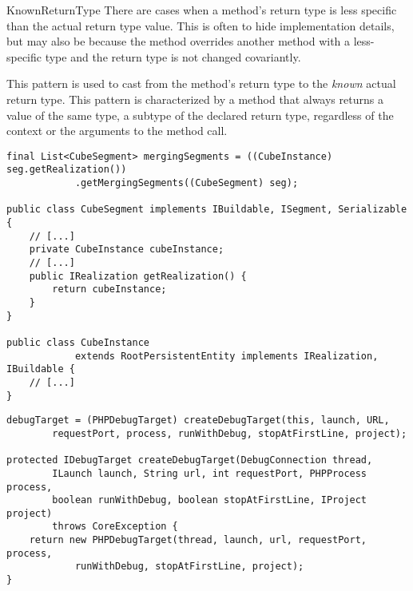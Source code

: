 \begin{pattern}{KnownReturnType}
There are cases when a method's return type is less specific than the
actual return type value.
This is often to hide implementation details, but may also be because the
  method overrides another method with a less-specific type
  and the return type is not changed covariantly.

This pattern is used to cast from the method's return type to
the \emph{known} actual return type.
This pattern is characterized by a method that always returns a
value of the same type, a subtype of the declared return type,
regardless of the context or the arguments to the method call.

\instances{}
\def\urlvar{http://bit.ly/apache_kylin_2SIjooO}


\begin{verbatim}
final List<CubeSegment> mergingSegments = ((CubeInstance) seg.getRealization())
            .getMergingSegments((CubeSegment) seg);

public class CubeSegment implements IBuildable, ISegment, Serializable {
    // [...]
    private CubeInstance cubeInstance;
    // [...]
    public IRealization getRealization() {
        return cubeInstance;
    }
}

public class CubeInstance
            extends RootPersistentEntity implements IRealization, IBuildable {
    // [...]
}
\end{verbatim}


\def\urlvar{http://bit.ly/eclipse_pdt_2Ekeu9v}

\begin{verbatim}
debugTarget = (PHPDebugTarget) createDebugTarget(this, launch, URL,
        requestPort, process, runWithDebug, stopAtFirstLine, project);

protected IDebugTarget createDebugTarget(DebugConnection thread,
        ILaunch launch, String url, int requestPort, PHPProcess process,
        boolean runWithDebug, boolean stopAtFirstLine, IProject project)
        throws CoreException {
    return new PHPDebugTarget(thread, launch, url, requestPort, process,
            runWithDebug, stopAtFirstLine, project);
}


\end{verbatim}
\end{pattern}
